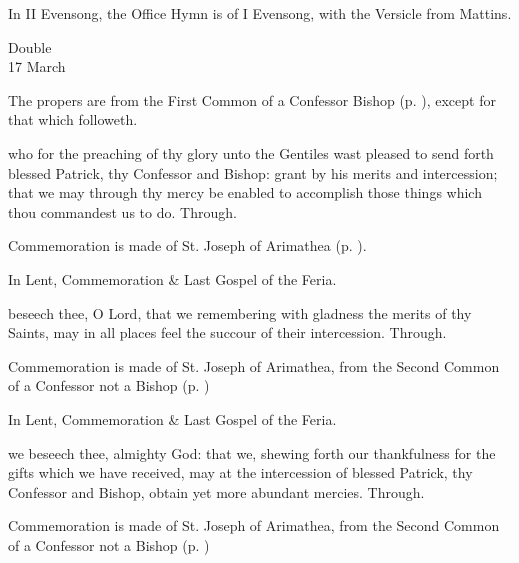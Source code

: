 \begin{rubric}
	In II Evensong, the Office Hymn is of I Evensong, with the Versicle from Mattins.
\end{rubric}


\begin{inhead}
    {Double\\
17 March}
\end{inhead}

\begin{rubric}
	The propers are from the First Common of a Confessor Bishop (p. \pageref{CommonConfessorBishopI}), except for that which followeth.
\end{rubric}

\collect
{} who for the preaching of thy glory unto the Gentiles wast pleased to send forth blessed Patrick, thy Confessor and Bishop: grant by his merits and intercession; that we may through thy mercy be enabled to accomplish those things which thou commandest us to do. Through.

\begin{rubric}
    Commemoration is made of St. Joseph of Arimathea (p. \pageref{ArimatheanCollect}).
\end{rubric}

\begin{rubric}
	In Lent, Commemoration \& Last Gospel of the Feria.
\end{rubric}

\secret
{} beseech thee, O Lord, that we remembering with gladness the merits of thy Saints, may in all places feel the succour of their intercession. Through.

\begin{rubric}
    Commemoration is made of St. Joseph of Arimathea, from the Second Common of a Confessor not a Bishop (p. \pageref{CommonConfessorNotBishopII})
\end{rubric}

\begin{rubric}
	In Lent, Commemoration \& Last Gospel of the Feria.
\end{rubric}

\postcommunion
{} we beseech thee, almighty God: that we, shewing forth our thankfulness for the gifts which we have received, may at the intercession of blessed Patrick, thy Confessor and Bishop, obtain yet more abundant mercies. Through.

\begin{rubric}
    Commemoration is made of St. Joseph of Arimathea, from the Second Common of a Confessor not a Bishop (p. \pageref{CommonConfessorNotBishopII})
\end{rubric}

